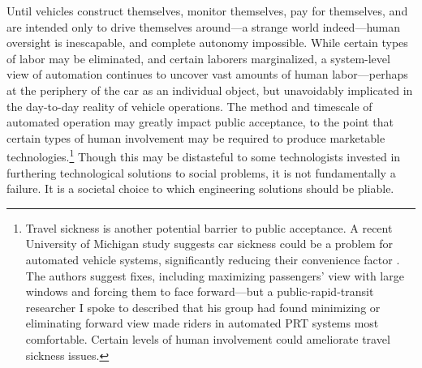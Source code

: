 Until
vehicles construct themselves, monitor themselves, pay for themselves,
and are intended only to drive themselves around---a strange world
indeed---human oversight is inescapable, and complete autonomy
impossible. While certain types of
labor may be eliminated, and certain laborers marginalized, a
system-level view of automation continues to uncover vast amounts of
human labor---perhaps at the periphery of the car as an individual
object, but unavoidably implicated in the day-to-day reality of
vehicle operations. The method and timescale of automated
operation may greatly impact 
public acceptance, to the point that certain types of human
involvement may be required to produce marketable
technologies.\footnote{Travel sickness is another potential barrier to
  public acceptance. A
  recent University of Michigan study suggests car sickness could be a
  problem for automated vehicle systems,  significantly reducing their
  convenience factor
  \cite{SivakSchoettleSick}. The authors suggest fixes, including
  maximizing passengers' view with large windows and forcing them to
  face forward---but a
  public-rapid-transit researcher I spoke to described that his group
  had found minimizing or eliminating forward view made riders in
  automated PRT systems
  most comfortable.
  Certain levels of human involvement could ameliorate travel sickness
  issues.} Though
this may be distasteful to some technologists invested in furthering
technological solutions to social problems, it is not fundamentally
a failure. It is a societal choice to which engineering solutions
should be pliable.


